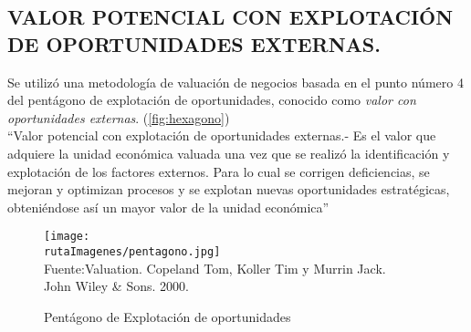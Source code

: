 \begin{rightcolumn}

\subsection{VALOR POTENCIAL CON EXPLOTACI\'ON DE OPORTUNIDADES EXTERNAS.}

Se utilizó una metodología de valuación de negocios basada en el punto número 4 del pentágono de explotación de oportunidades, conocido como \textit{valor con oportunidades externas}. (\autoref{fig:hexagono})\\

``\textcolor{secundario}{Valor potencial con explotaci\'on de oportunidades externas}.- Es el valor que adquiere la unidad econ\'omica valuada una vez que se realiz\'o la identificaci\'on y explotaci\'on de los factores externos. Para lo cual se corrigen deficiencias, se mejoran y optimizan procesos y se explotan nuevas oportunidades estrat\'egicas, obteni\'endose as\'i un mayor valor de la unidad econ\'omica''\\



\end{rightcolumn}
\begin{leftcolumn}

\begin{figure}[H]
\centering
\caption{Pent\'agono de Explotaci\'on de oportunidades\label{fig:hexagono}}
\texttt{[image: \\rutaImagenes/pentagono.jpg]}\\
\footnotesize{Fuente:Valuation. Copeland Tom, Koller Tim y Murrin Jack.\\
John Wiley \& Sons. 2000.}
\end{figure}

\end{leftcolumn}




